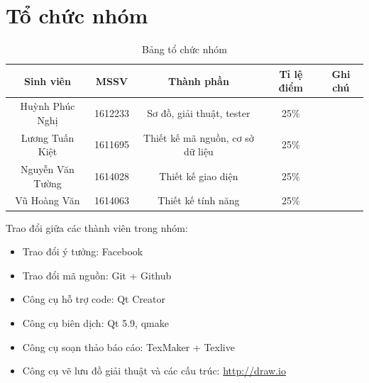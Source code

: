 \documentclass[a4paper]{article}
\begin{document}
\newpage
\thispagestyle{empty}
\listoftables

\newpage
\thispagestyle{empty}
\listoffigures

\newpage

\section{Tổ chức nhóm}
	\begin{table}[!h]
		\begin{center}
			\begin{tabular}{|c|c|c|c|c|}
				\hline 
				Sinh viên & MSSV & Thành phần & Tỉ lệ điểm & Ghi chú \\ 
				\hline 
		   	 	Huỳnh Phúc Nghị & 1612233 & Sơ đồ, giải thuật, tester & 25\%&   \\ 
			    \hline 
			    Lương Tuấn Kiệt & 1611695 & Thiết kế mã nguồn, cơ sở dữ liệu & 25\%&  \\ 
				\hline 
				Nguyễn Văn Tường & 1614028 & Thiết kế giao diện & 25\% &\\ 
				\hline 
				Vũ Hoàng Văn & 1614063 & Thiết kế tính năng & 25\% &\\ 
				\hline 
			\end{tabular} 
			\caption{Bảng tổ chức nhóm}
		\end{center}
	\end{table}
	Trao đổi giữa các thành viên trong nhóm:	
	\begin{itemize}
	\item Trao đổi ý tưởng: Facebook
	\item Trao đổi mã nguồn: Git + Github
	\item Công cụ hỗ trợ code: Qt Creator
	\item Công cụ biên dịch: Qt 5.9, qmake
	\item Công cụ soạn thảo báo cáo: TexMaker + Texlive
	\item Công cụ vẽ lưu đồ giải thuật và các cấu trúc: \url{http://draw.io}

	\end{itemize}
\newpage
\end{document}
